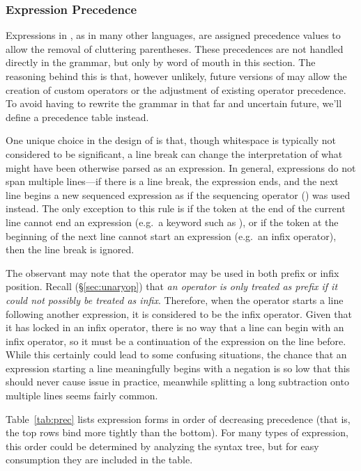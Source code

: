 \subsubsection{Expression Precedence}
\label{sec:precedence}

Expressions in \Trilogy{}, as in many other languages, are assigned precedence values to
allow the removal of cluttering parentheses. These precedences are not handled directly
in the grammar, but only by word of mouth in this section. The reasoning behind this is
that, however unlikely, future versions of \Trilogy{} may allow the creation of custom operators
or the adjustment of existing operator precedence. To avoid having to rewrite the
grammar in that far and uncertain future, we'll define a precedence table instead.

One unique choice in the design of \Trilogy{} is that, though whitespace is typically
not considered to be significant, a line break can change the interpretation of what
might have been otherwise parsed as an expression. In general,
expressions do not span multiple lines---if there is a line break, the expression ends,
and the next line begins a new sequenced expression as if the sequencing operator (\op{,})
was used instead. The only exception to this rule is if the token at the end of the
current line cannot end an expression (e.g.\ a keyword such as ), or if the token
at the beginning of the next line cannot start an expression (e.g.\ an infix operator),
then the line break is ignored.

The observant may note that the \op{-} operator may be used in both prefix or infix position.
Recall (\S\ref{sec:unaryop}) that \emph{an operator is only treated as prefix if it could not possibly
be treated as infix}. Therefore, when the \op{-} operator starts a line following another expression,
it is considered to be the infix operator. Given that it has locked in an infix operator,
there is no way that a line can begin with an infix operator, so it must be a continuation
of the expression on the line before. While this certainly could lead to some confusing
situations, the chance that an expression starting a line meaningfully begins with a negation
is so low that this should never cause issue in practice, meanwhile splitting a long subtraction
onto multiple lines seems fairly common.

Table~\ref{tab:prec} lists expression forms in order of decreasing precedence (that is,
the top rows bind more tightly than the bottom). For many types of expression, this
order could be determined by analyzing the syntax tree, but for easy consumption they
are included in the table.

